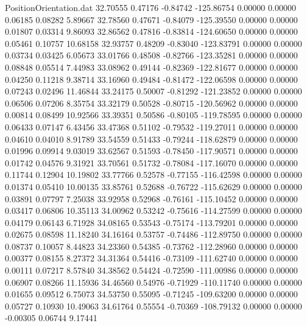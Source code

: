 \begin{filecontents}{PositionOrientation.dat}
  32.70555    0.47176   -0.84742  -125.86754    0.00000    0.00000    0.06185    0.08282    5.89667
  32.78560    0.47671   -0.84079  -125.39550    0.00000    0.00000    0.01807    0.03314    9.86093
  32.86562    0.47816   -0.83814  -124.60650    0.00000    0.00000    0.05461    0.10757   10.68158
  32.93757    0.48209   -0.83040  -123.83791    0.00000    0.00000    0.03734    0.03425    6.05673
  33.01766    0.48508   -0.82766  -123.35281    0.00000    0.00000    0.08848    0.05514    7.44983
  33.08962    0.49144   -0.82369  -122.81677    0.00000    0.00000    0.04250    0.11218    9.38714
  33.16960    0.49484   -0.81472  -122.06598    0.00000    0.00000    0.07243    0.02496   11.46844
  33.24175    0.50007   -0.81292  -121.23852    0.00000    0.00000    0.06506    0.07206    8.35754
  33.32179    0.50528   -0.80715  -120.56962    0.00000    0.00000    0.00814    0.08499   10.92566
  33.39351    0.50586   -0.80105  -119.78595    0.00000    0.00000    0.06433    0.07147    6.43456
  33.47368    0.51102   -0.79532  -119.27011    0.00000    0.00000    0.04610    0.04010    8.91789
  33.54559    0.51433   -0.79244  -118.62879    0.00000    0.00000    0.01996    0.09914    9.03019
  33.62567    0.51593   -0.78450  -117.90571    0.00000    0.00000    0.01742    0.04576    9.31921
  33.70561    0.51732   -0.78084  -117.16070    0.00000    0.00000    0.11744    0.12904   10.19802
  33.77766    0.52578   -0.77155  -116.42598    0.00000    0.00000    0.01374    0.05410   10.00135
  33.85761    0.52688   -0.76722  -115.62629    0.00000    0.00000    0.03891    0.07797    7.25038
  33.92958    0.52968   -0.76161  -115.10452    0.00000    0.00000    0.03417    0.06806   10.35113
  34.00962    0.53242   -0.75616  -114.27599    0.00000    0.00000    0.04179    0.06143    6.71928
  34.08165    0.53543   -0.75174  -113.79201    0.00000    0.00000    0.02675    0.08598   11.18240
  34.16164    0.53757   -0.74486  -112.89750    0.00000    0.00000    0.08737    0.10057    8.44823
  34.23360    0.54385   -0.73762  -112.28960    0.00000    0.00000    0.00377    0.08155    8.27372
  34.31364    0.54416   -0.73109  -111.62740    0.00000    0.00000    0.00111    0.07217    8.57840
  34.38562    0.54424   -0.72590  -111.00986    0.00000    0.00000    0.06907    0.08266   11.15936
  34.46560    0.54976   -0.71929  -110.11740    0.00000    0.00000    0.01655    0.09512    6.75073
  34.53750    0.55095   -0.71245  -109.63200    0.00000    0.00000    0.05727    0.10930   10.49063
  34.61764    0.55554   -0.70369  -108.79132    0.00000    0.00000   -0.00305    0.06744    9.17441

\end{filecontents}

